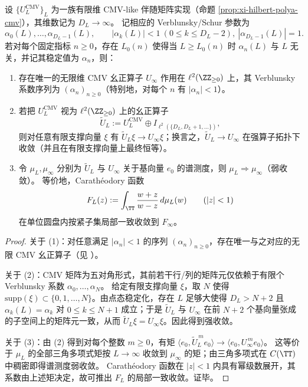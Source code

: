 \begin{theorem}[有限 CMV 证书的点态稳定化 \texorpdfstring{$\Rightarrow$}{=>} 无限维 CMV 谱实现]\label{thm:xi-cmv-stabilization-infinite}
设 \(\{U_L^{\mathrm{CMV}}\}_{L}\) 为一族有限维 CMV-like 伴随矩阵实现（命题 \ref{prop:xi-hilbert-polya-cmv}），其维数记为 \(D_L\to\infty\)。
记相应的 Verblunsky/Schur 参数为
\[
\alpha_0(L),\dots,\alpha_{D_L-1}(L),
\qquad
|\alpha_k(L)|<1\ (0\le k\le D_L-2),\ |\alpha_{D_L-1}(L)|=1.
\]
若对每个固定指标 \(n\ge 0\)，存在 \(L_0(n)\) 使得当 \(L\ge L_0(n)\) 时 \(\alpha_n(L)\) 与 \(L\) 无关，并记其稳定值为 \(\alpha_n\)，则：
\begin{enumerate}
  \item 存在唯一的无限维 CMV 幺正算子 \(U_\infty\) 作用在 \(\ell^2(\ZZ_{\ge 0})\) 上，其 Verblunsky 系数序列为 \((\alpha_n)_{n\ge 0}\)（特别地，对每个 \(n\) 有 \(|\alpha_n|<1\)）。
  \item 若把 \(U_L^{\mathrm{CMV}}\) 视为 \(\ell^2(\ZZ_{\ge 0})\) 上的幺正算子
  \[
  \widetilde U_L:=U_L^{\mathrm{CMV}}\oplus I_{\ell^2(\{D_L,D_L+1,\dots\})},
  \]
  则对任意有限支撑向量 \(\xi\) 有 \(\widetilde U_L\xi\to U_\infty\xi\)；换言之，\(\widetilde U_L\to U_\infty\) 在强算子拓扑下收敛（并且在有限支撑向量上最终恒等）。
  \item 令 \(\mu_L,\mu_\infty\) 分别为 \(\widetilde U_L\) 与 \(U_\infty\) 关于基向量 \(e_0\) 的谱测度，则 \(\mu_L\Rightarrow \mu_\infty\)（弱收敛）。
  等价地，Carath\'eodory 函数
  \[
  F_L(z):=\int_{\TT}\frac{w+z}{w-z}\,d\mu_L(w)\qquad(|z|<1)
  \]
  在单位圆盘内按紧子集局部一致收敛到 \(F_\infty\)。
\end{enumerate}
\end{theorem}

\begin{proof}
关于 (1)：对任意满足 \(|\alpha_n|<1\) 的序列 \((\alpha_n)_{n\ge 0}\)，存在唯一与之对应的无限 CMV 幺正算子（见 \cite{Simon2005OPUC1}）。

关于 (2)：CMV 矩阵为五对角形式，其前若干行/列的矩阵元仅依赖于有限个 Verblunsky 系数 \(\alpha_0,\dots,\alpha_{N}\)。
给定有限支撑向量 \(\xi\)，取 \(N\) 使得 \(\mathrm{supp}(\xi)\subset\{0,1,\dots,N\}\)。由点态稳定化，存在 \(L\) 足够大使得 \(D_L>N+2\) 且 \(\alpha_k(L)=\alpha_k\) 对 \(0\le k\le N+1\) 成立；于是 \(\widetilde U_L\) 与 \(U_\infty\) 在前 \(N+2\) 个基向量张成的子空间上的矩阵元一致，从而 \(\widetilde U_L\xi=U_\infty\xi\)。因此得到强收敛。

关于 (3)：由 (2) 得到对每个整数 \(m\ge 0\)，有矩 \(\langle e_0,\widetilde U_L^{\,m}e_0\rangle\to \langle e_0,U_\infty^{\,m}e_0\rangle\)。
这等价于 \(\mu_L\) 的全部三角多项式矩按 \(L\to\infty\) 收敛到 \(\mu_\infty\) 的矩；由三角多项式在 \(C(\TT)\) 中稠密即得谱测度弱收敛。
Carath\'eodory 函数在 \(|z|<1\) 内具有幂级数展开，其系数由上述矩决定，故可推出 \(F_L\) 的局部一致收敛。证毕。
\end{proof}

